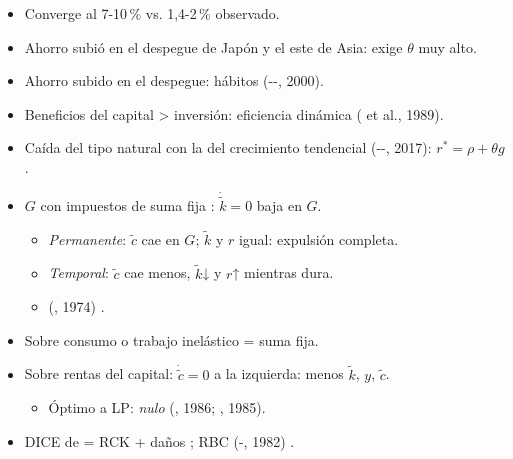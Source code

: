 \documentclass{article}
\begin{document}
\begin{columnas}
\begin{itemize}
\item Converge al 7-10\,\% vs. 1,4-2\,\% observado.
\item Ahorro subió en el despegue de Japón y el este de Asia: exige $\theta$ muy alto.
\item Ahorro subido en el despegue: hábitos (--, 2000).
\item Beneficios del capital > inversión: eficiencia dinámica ( et al., 1989).
\item Caída del tipo natural con la del crecimiento tendencial (--, 2017): $r^*=\rho+\theta g$.
\end{itemize}

\begin{itemize}
\item $G$ con impuestos de suma fija : $\dot{\tilde k}=0$ baja en $G$.
  \begin{itemize}
  \item \emph{Permanente}: $\tilde c$ cae en $G$; $\tilde k$ y $r$ igual: expulsión completa.
  \item \emph{Temporal}: $\tilde c$ cae menos, $\tilde k$↓ y $r$↑ mientras dura.
  \item {} (, 1974) .
  \end{itemize}
\end{itemize}
\begin{itemize}
\item Sobre consumo o trabajo inelástico = suma fija.
\item Sobre rentas del capital: $\dot{\tilde c}=0$ a la izquierda: menos $\tilde k$, $y$, $\tilde c$.
  \begin{itemize}
  \item Óptimo a LP: \emph{nulo} (, 1986; , 1985).
  \end{itemize}
\end{itemize}
\begin{itemize}
\item DICE de  = RCK + daños ; RBC (-, 1982) .
\end{itemize}


\end{columnas}
\end{document}
